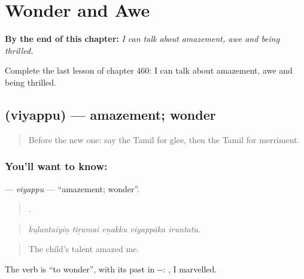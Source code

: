 
\chapter{Wonder and Awe}
\label{ch:ta-wonder-and-awe}

\begin{chapteropening}
\textbf{By the end of this chapter:} \emph{I can talk about amazement, awe and being thrilled.}

Complete the last lesson of chapter 460: I can talk about amazement, awe and being thrilled.
\end{chapteropening}

\section[\texorpdfstring{\ta{வியப்பு} (viyappu)}{வியப்பு (viyappu)}]{ (viyappu) — amazement; wonder}

\label{lesson:TA-C460-viyappu}



\begin{quote}
Before the new one: say the Tamil for glee, then the Tamil for merriment.
\end{quote}

\subsection*{You'll want to know: }
\textbf{} — \emph{viyappu} — \textquotedblleft{}amazement; wonder\textquotedblright{}.

\begin{quote}
    .
\end{quote}

\begin{quote}
\emph{kuḻantaiyiṉ tiṟamai eṉakku viyappāka iruntatu.}
\end{quote}

\begin{quote}
The child’s talent amazed me.
\end{quote}

The verb is  \textquotedblleft{}to wonder\textquotedblright{}, with its past in --: , I marvelled.

